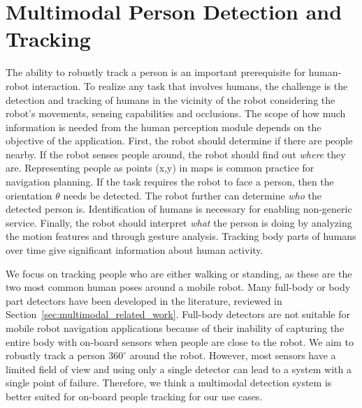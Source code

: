 \chapter{Multimodal Person Detection and Tracking}
\label{chapter:multimodal_person_detection_and_tracking}
The ability to robustly track a person is an important prerequisite for human-robot interaction. To realize any task that involves humans, the challenge is the detection and tracking of humans in the vicinity of the robot considering the robot's movements, sensing capabilities and occlusions. The scope of how much information is needed from the human perception module depends on the objective of the application. First, the robot should determine if there are people nearby. If the robot senses people around, the robot should find out \emph{where} they are. Representing people as points (x,y) in maps is common practice for navigation planning. If the task requires the robot to face a person, then the orientation $\theta$ needs be detected. The robot further can determine \emph{who} the detected person is. Identification of humans is necessary for enabling non-generic service. Finally, the robot should interpret \emph{what} the person is doing by analyzing the motion features and through gesture analysis. Tracking body parts of humans over time give significant information about human activity.

We focus on tracking people who are either walking or standing, as these are the two most common human poses around a mobile robot. Many full-body or body part detectors have been developed in the literature, reviewed in Section~\ref{sec:multimodal_related_work}. Full-body detectors are not suitable for mobile robot navigation applications because of their inability of capturing the entire body with on-board sensors when people are close to the robot. We aim to robustly track a person $360^{\circ}$ around the robot. However, most sensors have a limited field of view and using only a single detector can lead to a system with a single point of failure. Therefore, we think a multimodal detection system is better suited for on-board people tracking for our use cases. 

